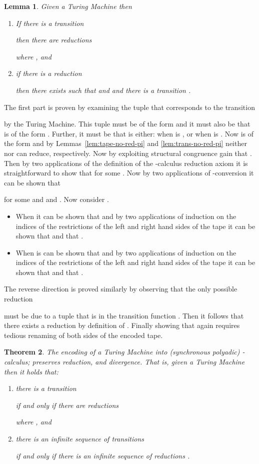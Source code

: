\documentclass[submission,copyright,creativecommons]{eptcs}
\newtheorem{theorem}{Theorem}[section]
\newtheorem{lemma}[theorem]{Lemma}
\newenvironment{proof}[1][Proof]{\begin{trivlist}
\item[\hskip \labelsep {\bfseries #1}]}{\end{trivlist}}
\begin{document}
\begin{lemma}
\label{lem:reduction-pi}
Given a Turing Machine 
then
\begin{enumerate}
\item If there is a transition

then there are reductions

where , and
\item if there is a reduction

then there exists  such that  and
 and
there is a transition
.
\end{enumerate}
\end{lemma}
\begin{proof}
The first part is proven by examining the tuple  that corresponds to the transition 

by the Turing Machine. This tuple must be of the form
 and it must also be that  is of the form
.
Further, it must be that  is either:
 when  is , or
 when  is .
Now 
is of the form
 and
by Lemmas~\ref{lem:tape-no-red-pi} and \ref{lem:trans-no-red-pi} neither 
nor  can reduce, respectively.
Now by exploiting structural congruence gain that
.
Then by two applications of the definition of the -calculus reduction axiom 
it is straightforward to show that
 for some .
Now by two applications of -conversion it can be shown that

for some  and  and .
Now consider .
\begin{itemize}
\item When  it can be shown that  and by two applications of induction on the
  indices of the restrictions  of the left and right hand sides of the tape it can be shown
  that  and that .
\item When  is can be shown that  and by two applications of induction on the
  indices of the restrictions  of the left and right hand sides of the tape it can be shown
  that  and that .
\end{itemize}

The reverse direction is proved similarly by observing that the only possible reduction

must be due to a tuple  that is in the transition function .
Then it follows that there exists a reduction  by definition of
.
Finally showing that 
again requires tedious renaming of both sides of the encoded tape.
\end{proof}

\begin{theorem}
\label{thm:done-pi}
The encoding  of a Turing Machine into (synchronous polyadic) -calculus;
preserves reduction, and divergence.
That is, given a Turing Machine 
then it holds that:
\begin{enumerate}
\item there is a transition

if and only if there are reductions

where , and
\item there is an infinite sequence of transitions

if and only if there is an infinite sequence of reductions
.
\end{enumerate}
\end{theorem}
\end{document}
